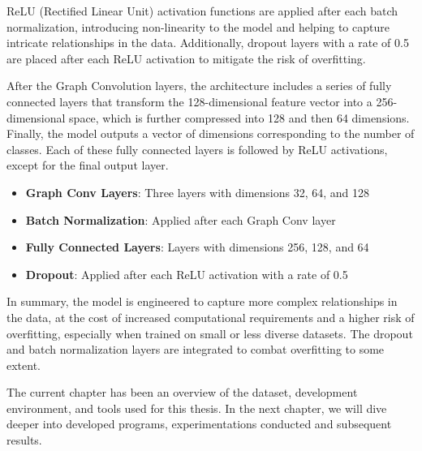ReLU (Rectified Linear Unit) activation functions are applied after each batch normalization, introducing non-linearity to the model and helping to capture intricate relationships in the data. Additionally, dropout layers with a rate of 0.5 are placed after each ReLU activation to mitigate the risk of overfitting.

After the Graph Convolution layers, the architecture includes a series of fully connected layers that transform the 128-dimensional feature vector into a 256-dimensional space, which is further compressed into 128 and then 64 dimensions. Finally, the model outputs a vector of dimensions corresponding to the number of classes. Each of these fully connected layers is followed by ReLU activations, except for the final output layer.

\begin{itemize}
    \item \textbf{Graph Conv Layers}: Three layers with dimensions 32, 64, and 128
    \item \textbf{Batch Normalization}: Applied after each Graph Conv layer
    \item \textbf{Fully Connected Layers}: Layers with dimensions 256, 128, and 64
    \item \textbf{Dropout}: Applied after each ReLU activation with a rate of 0.5
\end{itemize}

In summary, the model is engineered to capture more complex relationships in the data, at the cost of increased computational requirements and a higher risk of overfitting, especially when trained on small or less diverse datasets. The dropout and batch normalization layers are integrated to combat overfitting to some extent.

The current chapter has been an overview of the dataset, development environment, and tools used for this thesis. In the next chapter, we will dive deeper into developed programs, experimentations conducted and subsequent results.

